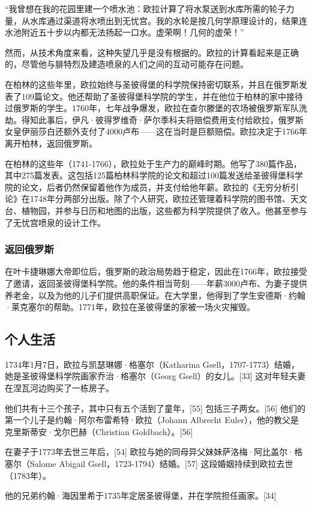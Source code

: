 “我曾想在我的花园里建一个喷水池：欧拉计算了将水泵送到水库所需的轮子力量，从水库通过渠道将水喷出到无忧宫。我的水轮是按几何学原理设计的，结果连水池附近五十步以内都无法扬起一口水。虚荣啊！几何的虚荣！”

然而，从技术角度来看，这种失望几乎是没有根据的。欧拉的计算看起来是正确的，尽管他与腓特烈及建造喷泉的人们之间的互动可能存在问题。

在柏林的这些年里，欧拉始终与圣彼得堡的科学院保持密切联系，并且在俄罗斯发表了109篇论文。他还帮助了圣彼得堡科学院的学生，并在他位于柏林的家中接待过俄罗斯的学生。1760年，七年战争爆发，欧拉在查尔滕堡的农场被俄罗斯军队洗劫。得知此事后，伊凡·彼得罗维奇·萨尔季科夫将赔偿费用支付给欧拉，俄罗斯女皇伊丽莎白还额外支付了4000卢布——这在当时是巨额赔偿。欧拉决定于1766年离开柏林，返回俄罗斯。

在柏林的这些年（1741-1766），欧拉处于生产力的巅峰时期。他写了380篇作品，其中275篇发表。这包括125篇柏林科学院的论文和超过100篇发送给圣彼得堡科学院的论文，后者仍然保留着他作为成员，并支付给他年薪。欧拉的《无穷分析引论》在1748年分两部分出版。除了个人研究，欧拉还管理着科学院的图书馆、天文台、植物园，并参与日历和地图的出版，这些都为科学院提供了收入。他甚至参与了无忧宫喷泉的设计工作。
\subsubsection{返回俄罗斯}  
在叶卡捷琳娜大帝即位后，俄罗斯的政治局势趋于稳定，因此在1766年，欧拉接受了邀请，返回圣彼得堡科学院。他的条件相当苛刻——年薪3000卢布、为妻子提供养老金，以及为他的儿子们提供高职保证。在大学里，他得到了学生安德斯·约翰·莱克塞尔的帮助。1771年，欧拉在圣彼得堡的家被一场火灾摧毁。
\subsection{个人生活}  
1734年1月7日，欧拉与凯瑟琳娜·格塞尔（Katharina Gsell，1707-1773）结婚，她是圣彼得堡科学院画家乔治·格塞尔（Georg Gsell）的女儿。[33] 这对年轻夫妻在涅瓦河边购买了一栋房子。

他们共有十三个孩子，其中只有五个活到了童年，[55] 包括三子两女。[56] 他们的第一个儿子是约翰·阿尔布雷希特·欧拉（Johann Albrecht Euler），他的教父是克里斯蒂安·戈尔巴赫（Christian Goldbach）。[56]

在妻子于1773年去世三年后，[54] 欧拉与她的同母异父妹妹萨洛梅·阿比盖尔·格塞尔（Salome Abigail Gsell，1723-1794）结婚。[57] 这段婚姻持续到欧拉去世（1783年）。

他的兄弟约翰·海因里希于1735年定居圣彼得堡，并在学院担任画家。[34]

